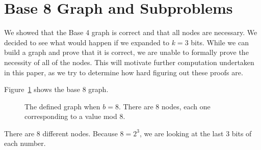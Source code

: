 \section{Base 8 Graph and Subproblems} \label{subsec:base8graphsubpblms}
We showed that the Base 4 graph is correct and that all nodes are necessary. We decided to see what would happen if we expanded to $k = 3$ bits. While we can build a graph and prove that it is correct, we are unable to formally prove the necessity of all of the nodes. This will motivate further computation undertaken in this paper, as we try to determine how hard figuring out these proofs are. \par
Figure~\ref{fig:base_8_graph} shows the base 8 graph.
\begin{figure}
    \centering
    \caption{The defined graph when $b = 8$. There are 8 nodes, each one corresponding to a value mod 8.}
    \label{fig:base_8_graph}
\end{figure}
There are 8 different nodes. Because $8 = 2^3$, we are looking at the last 3 bits of each number. 
